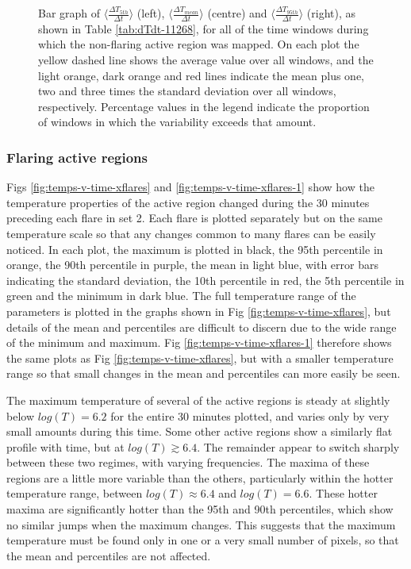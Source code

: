 \documentclass[namedreferences]{solarphysics}
\begin{document}
\begin{article}
\begin{figure}
\caption{Bar graph of $\langle\frac{\Delta T_{5th}}{\Delta t}\rangle$ (left), $\langle\frac{\Delta T_{mean}}{\Delta t}\rangle$ (centre) and $\langle\frac{\Delta T_{95th}}{\Delta t}\rangle$ (right), as shown in Table \ref{tab:dTdt-11268}, for all of the time windows during which the non-flaring active region was mapped.
On each plot the yellow dashed line shows the average value over all windows, and the light orange, dark orange and red lines indicate the mean plus one, two and three times the standard deviation over all windows, respectively.
Percentage values in the legend indicate the proportion of windows in which the variability exceeds that amount.\label{fig:Bar-graph-quiet}}
\end{figure}

\subsubsection{Flaring active regions}
Figs \ref{fig:temps-v-time-xflares} and \ref{fig:temps-v-time-xflares-1} show how the temperature properties of the active region changed during the 30 minutes preceding each flare in set 2.
Each flare is plotted separately but on the same temperature scale so that any changes common to many flares can be easily noticed.
In each plot, the maximum is plotted in black, the 95th percentile in orange, the 90th percentile in purple, the mean in light blue, with error bars indicating the standard deviation, the 10th percentile in red, the 5th percentile in green and the minimum in dark blue.
The full temperature range of the parameters is plotted in the graphs shown in Fig \ref{fig:temps-v-time-xflares}, but details of the mean and percentiles are difficult to discern due to the wide range of the minimum and maximum.
Fig \ref{fig:temps-v-time-xflares-1} therefore shows the same plots as Fig \ref{fig:temps-v-time-xflares}, but with a smaller temperature range so that small changes in the mean and percentiles can more easily be seen.

The maximum temperature of several of the active regions is steady at slightly below $log(T)=6.2$ for the entire 30 minutes plotted, and varies only by very small amounts during this time.
Some other active regions show a similarly flat profile with time, but at $log(T)\gtrsim6.4$.
The remainder appear to switch sharply between these two regimes, with varying frequencies.
The maxima of these regions are a little more variable than the others, particularly within the hotter temperature range, between $log(T)\approx6.4$ and $log(T)=6.6$.
These hotter maxima are significantly hotter than the 95th and 90th percentiles, which show no similar jumps when the maximum changes.
This suggests that the maximum temperature must be found only in one or a very small number of pixels, so that the mean and percentiles are not affected.


\end{article}
\end{document}
